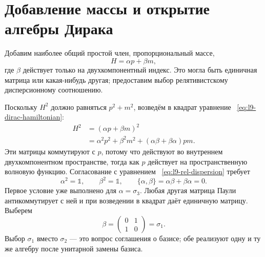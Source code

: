 \section{Добавление массы и открытие алгебры Дирака}

Добавим наиболее общий простой член, пропорциональный массе,
\begin{equation}
H=\alpha p+\beta m,
\label{eq:l9-dirac-hamiltonian}
\end{equation}
где \(\beta\) действует только на двухкомпонентный индекс. Это могла быть единичная матрица или какая-нибудь другая; предоставим выбор релятивистскому дисперсионному соотношению.

Поскольку \(H^2\) должно равняться \(p^2+m^2\), возведём в квадрат уравнение ~\eqref{eq:l9-dirac-hamiltonian}:
\begin{align}
H^2
&=(\alpha p+\beta m)^2\\
&=\alpha^2p^2+\beta^2m^2
+(\alpha\beta+\beta\alpha)pm.
\label{eq:l9-square-dirac}
\end{align}
Эти матрицы коммутируют с \(p\), потому что действуют во внутреннем двухкомпонентном пространстве, тогда как \(p\) действует на пространственную волновую функцию. Согласование с уравнением ~\eqref{eq:l9-rel-dispersion} требует
\begin{equation}
\alpha^2=\mathbb{1},
\qquad
\beta^2=\mathbb{1},
\qquad
\{\alpha,\beta\}
=\alpha\beta+\beta\alpha=0.
\label{eq:l9-dirac-algebra}
\end{equation}
Первое условие уже выполнено для \(\alpha=\sigma_3\). Любая другая матрица Паули антикоммутирует с ней и при возведении в квадрат даёт единичную матрицу. Выберем
\begin{equation}
\beta=
\begin{pmatrix}
0&1\\
1&0
\end{pmatrix}
=\sigma_1.
\label{eq:l9-beta}
\end{equation}
Выбор \(\sigma_1\) вместо \(\sigma_2\) — это вопрос соглашения о базисе; обе реализуют одну и ту же алгебру после унитарной замены базиса.

\begin{classroomqa}
\end{classroomqa}

